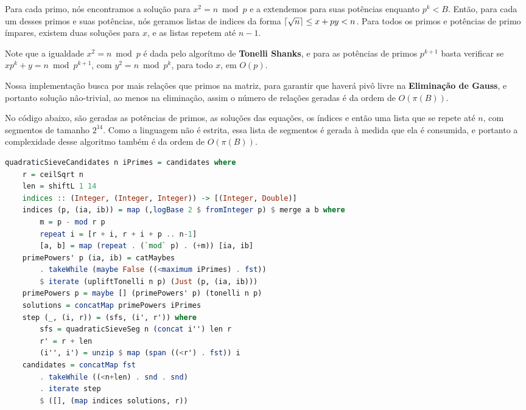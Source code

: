 \documentclass{article}
\DeclarePairedDelimiter{\ceil}{\lceil}{\rceil}
\begin{document}
Para cada primo, nós encontramos a solução para $x^2 = n \bmod p$ e a extendemos para suas potências enquanto $p^k < B$.
Então, para cada um desses primos e suas potências, nós geramos listas de indices da forma $\ceil{\sqrt{n}} \leq x + py < n$. Para todos os primos e potências de primo ímpares, existem duas soluções para $x$, e as listas repetem até $n-1$.

Note que a igualdade $x^2 = n \bmod p$ é dada pelo algorítmo de \textbf{Tonelli Shanks}, e para as potências de primos $p^{k+1}$ basta verificar se $x p^k + y = n \bmod p^{k+1}$, com $y^2 = n \bmod p^k$, para todo $x$, em $O(p)$.

Nossa implementação busca por mais relações que primos na matriz, para garantir que haverá pivô livre na \textbf{Eliminação de Gauss}, e portanto solução não-trivial, ao menos na eliminação, assim o número de relações geradas é da ordem de $O(\pi(B))$.

No código abaixo, são geradas as potências de primos, as soluções das equações, os índices e então uma lista que se repete até $n$, com segmentos de tamanho $2^{14}$. Como a linguagem não é estrita, essa lista de segmentos é gerada à medida que ela é consumida, e portanto a complexidade desse algoritmo também é da ordem de $O(\pi(B))$.

\begin{minipage}{0.9\linewidth}
\begin{lstlisting}[language=haskell,caption=Crivo Quadrático - Candidatos]
quadraticSieveCandidates n iPrimes = candidates where
    r = ceilSqrt n
    len = shiftL 1 14
    indices :: (Integer, (Integer, Integer)) -> [(Integer, Double)]
    indices (p, (ia, ib)) = map (,logBase 2 $ fromInteger p) $ merge a b where
        m = p - mod r p
        repeat i = [r + i, r + i + p .. n-1]
        [a, b] = map (repeat . (`mod` p) . (+m)) [ia, ib]
    primePowers' p (ia, ib) = catMaybes
        . takeWhile (maybe False ((<maximum iPrimes) . fst))
        $ iterate (upliftTonelli n p) (Just (p, (ia, ib)))
    primePowers p = maybe [] (primePowers' p) (tonelli n p)
    solutions = concatMap primePowers iPrimes
    step (_, (i, r)) = (sfs, (i', r')) where
        sfs = quadraticSieveSeg n (concat i'') len r
        r' = r + len
        (i'', i') = unzip $ map (span ((<r') . fst)) i
    candidates = concatMap fst
        . takeWhile ((<n+len) . snd . snd)
        . iterate step
        $ ([], (map indices solutions, r))
\end{lstlisting}
\end{minipage}
\end{document}
